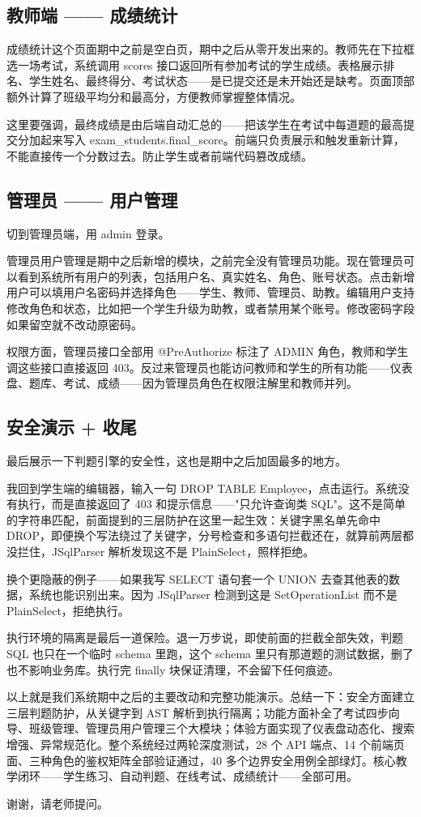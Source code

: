 \documentclass[12pt,a4paper]{article}
\begin{document}
\subsection*{教师端 —— 成绩统计}

成绩统计这个页面期中之前是空白页，期中之后从零开发出来的。教师先在下拉框选一场考试，系统调用 scores 接口返回所有参加考试的学生成绩。表格展示排名、学生姓名、最终得分、考试状态——是已提交还是未开始还是缺考。页面顶部额外计算了班级平均分和最高分，方便教师掌握整体情况。

这里要强调，最终成绩是由后端自动汇总的——把该学生在考试中每道题的最高提交分加起来写入 exam\_students.final\_score。前端只负责展示和触发重新计算，不能直接传一个分数过去。防止学生或者前端代码篡改成绩。

\subsection*{管理员 —— 用户管理}

切到管理员端，用 admin 登录。

管理员用户管理是期中之后新增的模块，之前完全没有管理员功能。现在管理员可以看到系统所有用户的列表，包括用户名、真实姓名、角色、账号状态。点击新增用户可以填用户名密码并选择角色——学生、教师、管理员、助教。编辑用户支持修改角色和状态，比如把一个学生升级为助教，或者禁用某个账号。修改密码字段如果留空就不改动原密码。

权限方面，管理员接口全部用 @PreAuthorize 标注了 ADMIN 角色，教师和学生调这些接口直接返回 403。反过来管理员也能访问教师和学生的所有功能——仪表盘、题库、考试、成绩——因为管理员角色在权限注解里和教师并列。

\subsection*{安全演示 + 收尾}

最后展示一下判题引擎的安全性，这也是期中之后加固最多的地方。

我回到学生端的编辑器，输入一句 DROP TABLE Employee，点击运行。系统没有执行，而是直接返回了 403 和提示信息——"只允许查询类 SQL"。这不是简单的字符串匹配，前面提到的三层防护在这里一起生效：关键字黑名单先命中 DROP，即便换个写法绕过了关键字，分号检查和多语句拦截还在，就算前两层都没拦住，JSqlParser 解析发现这不是 PlainSelect，照样拒绝。

换个更隐蔽的例子——如果我写 SELECT 语句套一个 UNION 去查其他表的数据，系统也能识别出来。因为 JSqlParser 检测到这是 SetOperationList 而不是 PlainSelect，拒绝执行。

执行环境的隔离是最后一道保险。退一万步说，即使前面的拦截全部失效，判题 SQL 也只在一个临时 schema 里跑，这个 schema 里只有那道题的测试数据，删了也不影响业务库。执行完 finally 块保证清理，不会留下任何痕迹。

以上就是我们系统期中之后的主要改动和完整功能演示。总结一下：安全方面建立三层判题防护，从关键字到 AST 解析到执行隔离；功能方面补全了考试四步向导、班级管理、管理员用户管理三个大模块；体验方面实现了仪表盘动态化、搜索增强、异常规范化。整个系统经过两轮深度测试，28 个 API 端点、14 个前端页面、三种角色的鉴权矩阵全部验证通过，40 多个边界安全用例全部绿灯。核心教学闭环——学生练习、自动判题、在线考试、成绩统计——全部可用。

谢谢，请老师提问。
\end{document}
